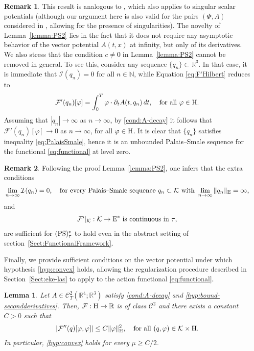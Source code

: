 \documentclass{article}
\newcommand{\boC}{\mathcal{C}}
\newcommand{\boK}{\mathcal{K}}
\newcommand{\boI}{\mathcal{I}}
\newcommand{\R}{\mathbb{R}}
\newcommand{\boF}{\mathcal{F}}
\newcommand{\Hilb}{{\textnormal H}}
\newcommand{\Ebanach}{{\textnormal E}}
\newcommand{\PS}{(\textnormal{PS})^{*}_\tau}
\newtheorem{lemma}{Lemma}[section]
\theoremstyle{definition}
\newtheorem{remark}{Remark}[section]
\begin{document}
	\begin{remark}\label{Remark:PS-0}
		This result is analogous to \cite[Lemma 3.5]{AS}, which also applies to singular scalar potentials (although our argument here is also valid for the pairs $(\Phi,A)$ considered in \cite{GLM}, allowing for the presence of singularities). The novelty of Lemma~\ref{lemma:PS2} lies in the fact that it does not require any asymptotic behavior of the vector potential $A(t,x)$ at infinity, but only of its derivatives. We also stress that the condition $c\neq0$ in Lemma~\ref{lemma:PS2} cannot be removed in general. To see this, consider any sequence $\{q_n\}\subset\R^3$. In that case, it is immediate that $\boI(q_n)=0$ for all $n\in\mathbb{N}$, while Equation \eqref{eq:F'Hilbert} reduces to
		\begin{equation}
			\boF'(q_n)[\varphi]=\int_0^T \varphi\cdot\partial_t A(t,q_n)\, dt,\quad\hbox{for all }\varphi\in\Hilb.
		\end{equation}
		Assuming that $|q_n|\to\infty$ as $n\to\infty$, by \eqref{cond:A-decay} it follows that
		$\boF'(q_n)[\varphi]\to 0$ as $n\to\infty$, for all $\varphi\in\Hilb$. It is clear that $\{q_n\}$ satisfies inequality \eqref{eq:PalaisSmale}, hence it is an unbounded Palais–Smale sequence for the functional \eqref{eq:functional} at level zero.
	\end{remark}
	\begin{remark}
		Following the proof Lemma~\ref{lemma:PS2}, one infers that the extra conditions
		\begin{equation}\label{hyp:decay}
			 \lim_{n\to\infty}\boI(q_n)=0,\quad\text{for every Palais--Smale sequence }{q_n}\subset\boK\text{ with }\lim_{n\to\infty}\|q_n\|_{\Ebanach}=\infty,
		\end{equation}
		and	\begin{equation}\label{hyp:FContinuousTau}
			\hbox{$\boF'|_\boK:\boK\to \Ebanach^*$ is continuous in $\tau$},
		\end{equation}
		are sufficient for $\PS$ to hold even in the abstract setting of section~\ref{Sect:FunctionalFramework}.
	\end{remark}
	Finally, we provide sufficient conditions on the vector potential under which hypothesis \eqref{hyp:convex} holds, allowing the regularization procedure described in Section~\ref{Sect:eke-las} to apply to the action functional \eqref{eq:functional}.
	\begin{lemma}\label{lemma:FunctionalC2}
		Let $A\in\mathcal{C}_T^2(\R^4;\R^3)$ satisfy \eqref{cond:A-decay} and \eqref{hyp:bound-secondderivatives}. Then, $\boF:\Hilb\to\R$ is of class $\boC^2$ and there exists a constant $C>0$  such that
		\begin{equation}\label{eq:F''-estimate}
			|\boF''(q)[\varphi,\varphi]|\leq C\|\varphi\|_{\Hilb}^2,\quad\text{for all }(q,\varphi)\in \boK\times\Hilb.
		\end{equation}
		In particular,  \eqref{hyp:convex} holds for every $\mu\geq C/2$.
	\end{lemma}
\end{document}
